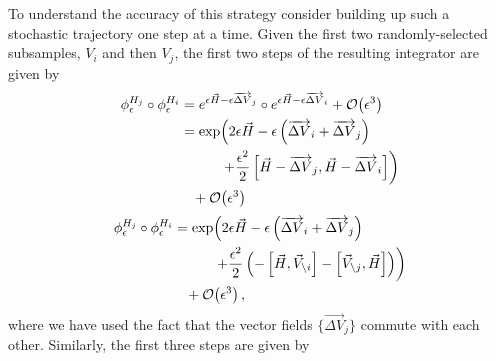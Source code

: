 \documentclass{article}
\begin{document}
To understand the accuracy of this strategy consider building up such a 
stochastic trajectory one step at a time.  Given the first two randomly-selected 
subsamples, $V_{i}$ and then $V_{j}$, the first two steps of the resulting
integrator are given by
%
\begin{align*}
\phi^{H_{j}}_{\epsilon} \circ \phi^{H_{i}}_{\epsilon}
&=
e^{ \epsilon \vec{H} - \epsilon  \overrightarrow{ \Delta V}_{j} } 
\circ e^{ \epsilon \vec{H} - \epsilon  \overrightarrow{ \Delta V}_{i} }
+ \mathcal{O} \! \left( \epsilon^{3} \right)
\\
&=
\exp \! \left( 
2 \epsilon \vec{H} - \epsilon \left(  \overrightarrow{ \Delta V}_{i} +  \overrightarrow{ \Delta V}_{j} \right)
\right.
\\
& \hspace{10mm} \left.
+ \frac{\epsilon^{2}}{2} \left[ \vec{H} -  \overrightarrow{ \Delta V}_{j}, \vec{H} - \overrightarrow{ \Delta V}_{i} \right]
\right)
\\
& \hspace{3mm}
+ \mathcal{O} \! \left( \epsilon^{3} \right)
\end{align*}
%
\begin{align*}
\phi^{H_{j}}_{\epsilon} \circ \phi^{H_{i}}_{\epsilon}
&=
\exp \! \left( 
2 \epsilon \vec{H} - \epsilon \left( \overrightarrow{ \Delta V}_{i} + \overrightarrow{ \Delta V}_{j} \right)
\right.
\\
& \hspace{10mm} \left.
+ \frac{\epsilon^{2}}{2} \left(
- \left[ \vec{H}, \vec{V}_{\setminus i} \right]
- \left[ \vec{V}_{\setminus j}, \vec{H} \right] \right) \right)
\\
& \hspace{3mm}
+ \mathcal{O} \! \left( \epsilon^{3} \right),
\end{align*}
%
where we have used the fact that the vector fields $\{ \overrightarrow{ \Delta V}_{j} \}$ commute
with each other.  Similarly, the first three steps are given by
%
\end{document}
